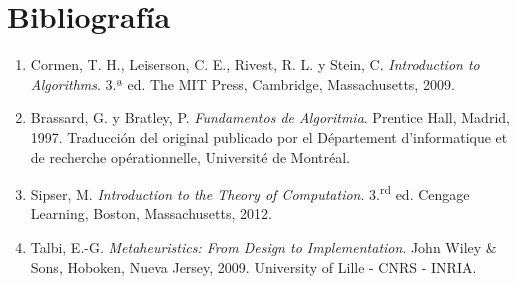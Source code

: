 \documentclass[12pt,letterpaper]{article}
\begin{document}
\section{Bibliografía}
\label{sec:bibliografia}

\begin{enumerate}
    \item Cormen, T. H., Leiserson, C. E., Rivest, R. L. y Stein, C. \emph{Introduction to Algorithms}. 3.ª ed. The MIT Press, Cambridge, Massachusetts, 2009.
    \item Brassard, G. y Bratley, P. \emph{Fundamentos de Algoritmia}. Prentice Hall, Madrid, 1997. Traducción del original publicado por el Département d'informatique et de recherche opérationnelle, Université de Montréal.
    \item Sipser, M. \emph{Introduction to the Theory of Computation}. 3.\textsuperscript{rd} ed. Cengage Learning, Boston, Massachusetts, 2012.
    \item Talbi, E.-G. \emph{Metaheuristics: From Design to Implementation}. John Wiley \& Sons, Hoboken, Nueva Jersey, 2009. University of Lille - CNRS - INRIA.
\end{enumerate}
\end{document}
